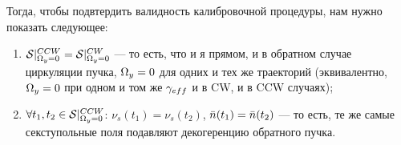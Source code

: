 Тогда, чтобы подвтердить валидность калибровочной процедуры, нам нужно показать следующее:
\begin{enumerate}
\item $\Stab*^{CCW} = \Stab*^{CW}$ --- то есть, что и я прямом, и в обратном случае циркуляции пучка,
  $\Omega_y = 0$ для одних и тех же траекторий (эквивалентно, $\Omega_y=0$ при одном и том же $\g*$ и в CW, и в CCW
  случаях);
\item $\forall t_1,t_2\in\Stab*^{CCW}$: $\nu_s(t_1) = \nu_s(t_2)$, $\bar n(t_1) = \bar n(t_2)$ ---
  то есть, те же самые секступольные поля подавляют декогеренцию обратного пучка.
\end{enumerate}








